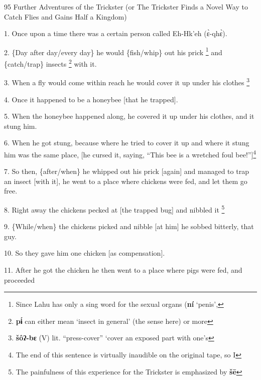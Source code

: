 
95 Further Adventures of the Trickster (or The Trickster Finds a Novel Way to Catch
Flies and Gains Half a Kingdom)

1. Once upon a time there was a certain person called Eh-Hk'eh (ɛ̀-qhɛ̀).

2. \{Day after day/every day\} he would \{fish/whip\} out his prick \footnote{Since Lahu has only a sing word for the sexual organs (\textbf{ní }`penis',} and \{catch/trap\}
insects \footnote{\textbf{pɨ́ }can either mean `insect in general' (the sense here) or more} with it.

3. When a fly would come within reach he would cover it up under his clothes \footnote{\textbf{šôʔ-bɛ} (V) lit. ``press-cover'' `cover an exposed part with one's}

4. Once it happened to be a honeybee [that he trapped].

5. When the honeybee happened along, he covered it up under his clothes, and it
stung him.

6. When he got stung, because where he tried to cover it up and where it stung
him was the same place, [he cursed it, saying, ``This bee is a wretched foul bee!'']\footnote{The end of this sentence is virtually inaudible on the original tape, so I}

7. So then, \{after/when\} he whipped out his prick [again] and managed to trap
an insect [with it], he went to a place where chickens were fed, and let them go
free.

8. Right away the chickens pecked at [the trapped bug] and nibbled it \.\footnote{The painfulness of this experience for the Trickster is emphasized by \textbf{šē}}

9. \{While/when\} the chickens picked and nibble [at him] he sobbed bitterly, that
guy.

10. So they gave him one chicken [as compensation].

11. After he got the chicken he then went to a place where pigs were fed, and proceeded
